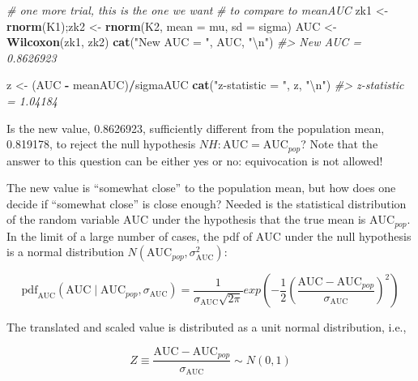 \documentclass[
]{book}
\newenvironment{Shaded}{\begin{snugshade}}{\end{snugshade}}
\newcommand{\CharTok}[1]{\textcolor[rgb]{0.31,0.60,0.02}{#1}}
\newcommand{\CommentTok}[1]{\textcolor[rgb]{0.56,0.35,0.01}{\textit{#1}}}
\newcommand{\DataTypeTok}[1]{\textcolor[rgb]{0.13,0.29,0.53}{#1}}
\newcommand{\KeywordTok}[1]{\textcolor[rgb]{0.13,0.29,0.53}{\textbf{#1}}}
\newcommand{\NormalTok}[1]{#1}
\newcommand{\OperatorTok}[1]{\textcolor[rgb]{0.81,0.36,0.00}{\textbf{#1}}}
\newcommand{\StringTok}[1]{\textcolor[rgb]{0.31,0.60,0.02}{#1}}
\begin{document}
\begin{Shaded}
\begin{Highlighting}[]
\CommentTok{\# one more trial, this is the one we want }
\CommentTok{\# to compare to meanAUC}
\NormalTok{zk1 \textless{}{-}}\StringTok{ }\KeywordTok{rnorm}\NormalTok{(K1);zk2 \textless{}{-}}\StringTok{ }\KeywordTok{rnorm}\NormalTok{(K2, }\DataTypeTok{mean =}\NormalTok{ mu, }\DataTypeTok{sd =}\NormalTok{ sigma) }
\NormalTok{AUC \textless{}{-}}\StringTok{ }\KeywordTok{Wilcoxon}\NormalTok{(zk1, zk2)}
\KeywordTok{cat}\NormalTok{(}\StringTok{"New AUC = "}\NormalTok{, AUC, }\StringTok{"}\CharTok{\textbackslash{}n}\StringTok{"}\NormalTok{)}
\CommentTok{\#\textgreater{} New AUC =  0.8626923}

\NormalTok{z \textless{}{-}}\StringTok{ }\NormalTok{(AUC }\OperatorTok{{-}}\StringTok{ }\NormalTok{meanAUC)}\OperatorTok{/}\NormalTok{sigmaAUC}
\KeywordTok{cat}\NormalTok{(}\StringTok{"z{-}statistic = "}\NormalTok{, z, }\StringTok{"}\CharTok{\textbackslash{}n}\StringTok{"}\NormalTok{)}
\CommentTok{\#\textgreater{} z{-}statistic =  1.04184}
\end{Highlighting}
\end{Shaded}

Is the new value, 0.8626923, sufficiently different from the population mean, 0.819178, to reject the null hypothesis \(NH: \text{AUC} = \text{AUC}_{pop}\)? Note that the answer to this question can be either yes or no: equivocation is not allowed!

The new value is ``somewhat close'' to the population mean, but how does one decide if ``somewhat close'' is close enough? Needed is the statistical distribution of the random variable \(\text{AUC}\) under the hypothesis that the true mean is \(\text{AUC}_{pop}\). In the limit of a large number of cases, the pdf of \(\text{AUC}\) under the null hypothesis is a normal distribution \(N\left ( \text{AUC}_{pop}, \sigma_{\text{AUC}}^{2} \right )\):

\begin{equation*} 
\text{pdf}_{\text{AUC}}\left ( \text{AUC}\mid \text{AUC}_{pop}, \sigma_{\text{AUC}} \right )=\frac{1}{\sigma_{\text{AUC}}\sqrt{2\pi}}exp\left ( -\frac{1}{2} \left ( \frac{\text{AUC}-\text{AUC}_{pop}}{\sigma_{\text{AUC}}} \right )^2\right )
\end{equation*}

The translated and scaled value is distributed as a unit normal distribution, i.e.,

\begin{equation*} 
Z \equiv \frac{\text{AUC}-\text{AUC}_{pop}}{\sigma_{\text{AUC}}}\sim N\left ( 0,1 \right )
\end{equation*}
\end{document}
